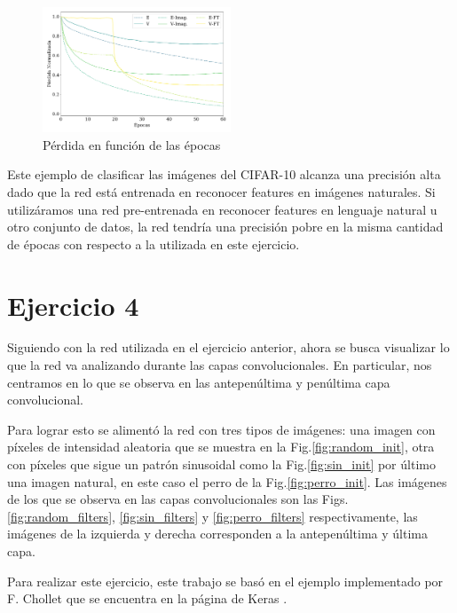     \begin{figure}[H]
        \begin{small}
            \begin{center}
                \includegraphics[width=0.5\textwidth]{Figs/ejer3_loss.pdf}
            \end{center}
            \caption{Pérdida en función de las épocas}
            \label{fig:ejer3_loss}
        \end{small}
    \end{figure}

    Este ejemplo de clasificar las imágenes del CIFAR-10 alcanza una  precisión alta dado que la red está entrenada en reconocer features en imágenes naturales. Si utilizáramos una red pre-entrenada en reconocer features en lenguaje natural u otro conjunto de datos, la red tendría una precisión pobre en la misma cantidad de épocas con respecto a la utilizada en este ejercicio.


\section*{Ejercicio 4}

Siguiendo con la red utilizada en el ejercicio anterior, ahora se busca visualizar lo que la red va analizando durante las capas convolucionales. En particular, nos centramos en lo que se observa en las antepenúltima y penúltima capa convolucional.

Para lograr esto se alimentó la red con tres tipos de imágenes: una imagen con píxeles de intensidad aleatoria que se muestra en la Fig.\ref{fig:random_init}, otra con píxeles que sigue un patrón sinusoidal como la Fig.\ref{fig:sin_init} por último una imagen natural, en este caso el perro de la Fig.\ref{fig:perro_init}. Las imágenes de los que se observa en las capas convolucionales son las Figs. \ref{fig:random_filters}, \ref{fig:sin_filters} y \ref{fig:perro_filters} respectivamente,  las imágenes de la izquierda y derecha corresponden a la antepenúltima y última capa.

Para realizar este ejercicio, este trabajo se basó en el ejemplo implementado por F. Chollet que se encuentra en la página de Keras \cite{keras}.

